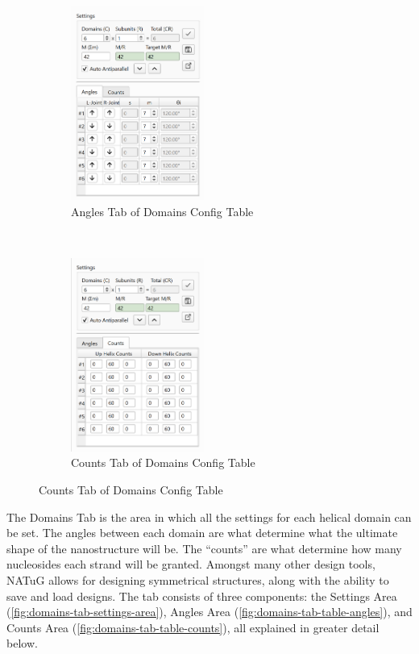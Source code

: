 \documentclass[titlepage]{article}
\begin{document}
\begin{figure}[h]
	\centering
	\caption{Domains Config Table}
	
	\begin{subfigure}{.45\linewidth}
		\label{fig:domains-config-table-angles-tab}
		\centering
		\includegraphics[height=2.5in]{domain-config-table-angles.png}
		\caption{Angles Tab of Domains Config Table}
	\end{subfigure}%
	~
	\begin{subfigure}{.45\linewidth}
		\label{fig:domains-config-table-counts-tab}
		\centering
		\includegraphics[height=2.5in]{domain-config-table-counts.png}
		\caption{Counts Tab of Domains Config Table}
	\end{subfigure}
	
	\label{fig:domain-config-table-angles}
\end{figure}

The Domains Tab is the area in which all the settings for each helical domain can be set. The angles between each domain are what determine what the ultimate shape of the nanostructure will be. The ``counts'' are what determine how many nucleosides each strand will be granted. Amongst many other design tools, NATuG allows for designing symmetrical structures, along with the ability to save and load designs. The tab consists of three components: the Settings Area (\ref{fig:domains-tab-settings-area}), Angles Area (\ref{fig:domains-tab-table-angles}), and Counts Area (\ref{fig:domains-tab-table-counts}), all explained in greater detail below.
\end{document}
